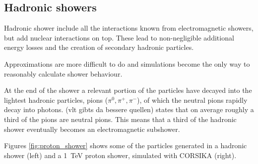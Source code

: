\subsection{Hadronic showers}
Hadronic shower include all the interactions known from 
electromagnetic showers, but add nuclear interactions on top.
These lead to non-negligible additional energy losses 
and the creation of secondary hadronic particles.

Approximations are more difficult to do and simulations 
become the only way to reasonably calculate shower behaviour.

At the end of the shower a relevant portion of the particles have decayed into the 
lightest hadronic particles, pions ($\pi^0, \pi^+, \pi^-$), of which the neutral pions 
rapidly decay into photons.
\cite{bookap} (vlt gibts da bessere quellen) states that on average
roughly a third of the pions are neutral pions. This means that 
a third of the hadronic shower eventually becomes an electromagnetic
subshower.

Figures \ref{fig:proton_shower}
shows some of the particles generated in a hadronic shower (left)
and a \SI{1}{\tera\electronvolt} proton shower, simulated with CORSIKA (right).

